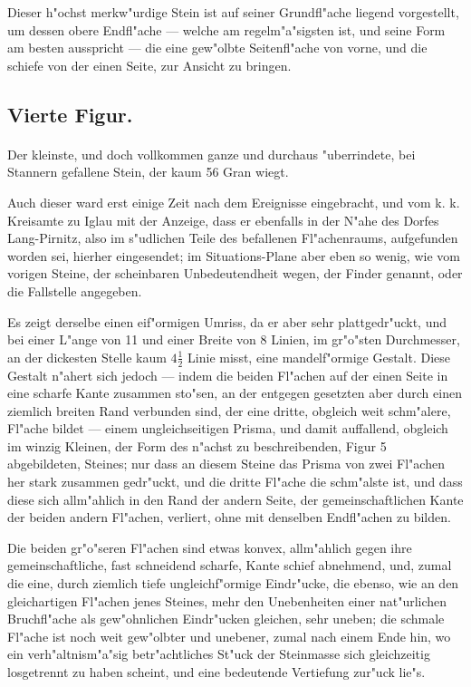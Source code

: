 \documentclass[a4paper, 11pt, oneside, german]{article}
\begin{document}
Dieser h"ochst merkw"urdige Stein ist auf seiner Grundfl"ache liegend vorgestellt, um dessen obere Endfl"ache --- welche am regelm"a"sigsten ist, und seine Form am besten ausspricht --- die eine gew"olbte Seitenfl"ache von vorne, und die schiefe von der einen Seite, zur Ansicht zu bringen.

\subsection{Vierte Figur.}
\paragraph{}
Der kleinste, und doch vollkommen ganze und durchaus "uberrindete, bei Stannern gefallene Stein, der kaum 56 Gran wiegt.

Auch dieser ward erst einige Zeit nach dem Ereignisse eingebracht, und vom k. k. Kreisamte zu Iglau mit der Anzeige, dass er ebenfalls in der N"ahe des Dorfes Lang-Pirnitz, also im s"udlichen Teile des befallenen Fl"achenraums, aufgefunden worden sei, hierher eingesendet; im Situations-Plane aber eben so wenig, wie vom vorigen Steine, der scheinbaren Unbedeutendheit wegen, der Finder genannt, oder die Fallstelle angegeben.

Es zeigt derselbe einen eif"ormigen Umriss, da er aber sehr plattgedr"uckt, und bei einer L"ange von 11 und einer Breite von 8 Linien, im gr"o"sten Durchmesser, an der dickesten Stelle kaum $4\frac{1}{2}$ Linie misst, eine mandelf"ormige Gestalt. Diese Gestalt n"ahert sich jedoch --- indem die beiden Fl"achen auf der einen Seite in eine scharfe Kante zusammen sto"sen, an der entgegen gesetzten aber durch einen ziemlich breiten Rand verbunden sind, der eine dritte, obgleich weit schm"alere, Fl"ache bildet --- einem ungleichseitigen Prisma, und damit auffallend, obgleich im winzig Kleinen, der Form des n"achst zu beschreibenden, Figur 5 abgebildeten, Steines; nur dass an diesem Steine das Prisma von zwei Fl"achen her stark zusammen gedr"uckt, und die dritte Fl"ache die schm"alste ist, und dass diese sich allm"ahlich in den Rand der andern Seite, der gemeinschaftlichen Kante der beiden andern Fl"achen, verliert, ohne mit denselben Endfl"achen zu bilden.

Die beiden gr"o"seren Fl"achen sind etwas konvex, allm"ahlich gegen ihre gemeinschaftliche, fast schneidend scharfe, Kante schief abnehmend, und, zumal die eine, durch ziemlich tiefe ungleichf"ormige Eindr"ucke, die ebenso, wie an den gleichartigen Fl"achen jenes Steines, mehr den Unebenheiten einer nat"urlichen Bruchfl"ache als gew"ohnlichen Eindr"ucken gleichen, sehr uneben; die schmale Fl"ache ist noch weit gew"olbter und unebener, zumal nach einem Ende hin, wo ein verh"altnism"a"sig betr"achtliches St"uck der Steinmasse sich gleichzeitig losgetrennt zu haben scheint, und eine bedeutende Vertiefung zur"uck lie"s.
\end{document}
